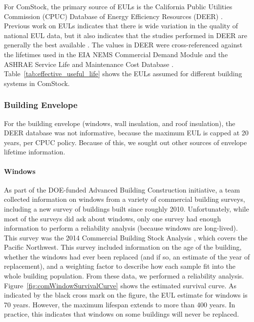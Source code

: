 \par
For ComStock, the primary source of EULs is the California Public Utilities Commission (CPUC) Database of Energy Efficiency Resources (DEER) \citep{cpuc_deer}. Previous work on EULs indicates that there is wide variation in the quality of national EUL data, but it also indicates that the studies performed in DEER are generally the best available \citep{what_makes_good_eul}. The values in DEER were cross-referenced against the lifetimes used in the EIA NEMS Commercial Demand Module \citep{nems_com_demand_module} and the ASHRAE Service Life and Maintenance Cost Database \citep{ashrae_reliability_db}. Table~\ref{tab:effective_useful_life} shows the EULs assumed for different building systems in ComStock.



\subsubsection{Building Envelope}
For the building envelope (windows, wall insulation, and roof insulation), the DEER database was not informative, because the maximum EUL is capped at 20 years, per CPUC policy. Because of this, we sought out other sources of envelope lifetime information.

\paragraph{Windows}
As part of the DOE-funded Advanced Building Construction initiative, a team collected information on windows from a variety of commercial building surveys, including a new survey of buildings built since roughly 2010. Unfortunately, while most of the surveys did ask about windows, only one survey had enough information to perform a reliability analysis (because windows are long-lived). This survey was the 2014 Commercial Building Stock Analysis \citep{neea2014cbsa}, which covers the Pacific Northwest. This survey included information on the age of the building, whether the windows had ever been replaced (and if so, an estimate of the year of replacement), and a weighting factor to describe how each sample fit into the whole building population. From these data, we performed a reliability analysis. Figure~\ref{fig:comWindowSurvivalCurve} shows the estimated survival curve. As indicated by the black cross mark on the figure, the EUL estimate for windows is 70 years. However, the maximum lifespan extends to more than 400 years. In practice, this indicates that windows on some buildings will never be replaced.

